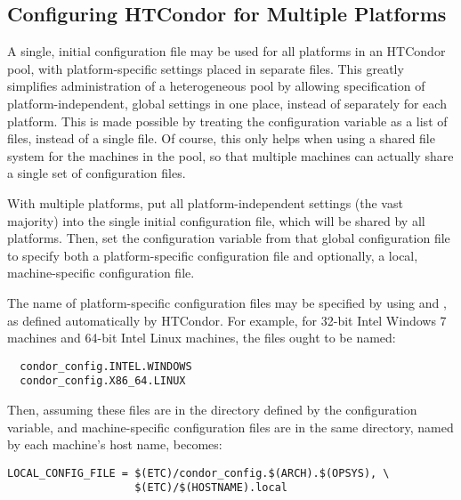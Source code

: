 \subsection{\label{sec:Multiple-Platforms}Configuring HTCondor for
Multiple Platforms} 

A single, initial configuration file may be used for all platforms 
in an HTCondor pool, 
with  platform-specific settings placed in separate files.  
This greatly
simplifies administration of a heterogeneous pool by allowing
specification of platform-independent, global settings in one place, instead of
separately for each platform.  This is made possible by treating the
 configuration variable as a
list of files, instead of a single file.  Of course, this only
helps when using a shared file system for the machines in the
pool, so that multiple machines can actually share a single set of
configuration files.

With multiple platforms, put all
platform-independent settings (the vast majority) into the 
single initial configuration file, 
which will be shared by all platforms.
Then, set the  configuration variable from that
global configuration file to specify both a platform-specific
configuration file and
optionally, a local, machine-specific configuration file.

The name of 
platform-specific configuration files may be specified by using 
 and , 
as defined automatically by HTCondor.
For example, for 32-bit Intel Windows 7
machines and 64-bit Intel Linux machines,
the files ought to be named:

\begin{verbatim}
  condor_config.INTEL.WINDOWS
  condor_config.X86_64.LINUX
\end{verbatim}

Then, assuming these files are in the directory defined by the
 configuration variable,
and machine-specific configuration files are in
the same directory, named by each machine's host name,
 becomes:

\footnotesize
\begin{verbatim}
LOCAL_CONFIG_FILE = $(ETC)/condor_config.$(ARCH).$(OPSYS), \
                    $(ETC)/$(HOSTNAME).local
\end{verbatim}
\normalsize

